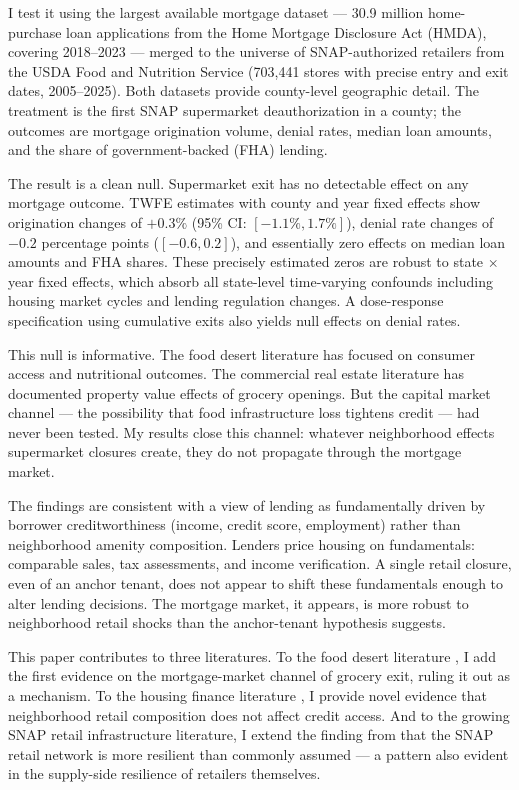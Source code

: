 \documentclass[12pt]{article}
\begin{document}
I test it using the largest available mortgage dataset --- 30.9 million home-purchase loan applications from the Home Mortgage Disclosure Act (HMDA), covering 2018--2023 --- merged to the universe of SNAP-authorized retailers from the USDA Food and Nutrition Service (703,441 stores with precise entry and exit dates, 2005--2025). Both datasets provide county-level geographic detail. The treatment is the first SNAP supermarket deauthorization in a county; the outcomes are mortgage origination volume, denial rates, median loan amounts, and the share of government-backed (FHA) lending.

The result is a clean null. Supermarket exit has no detectable effect on any mortgage outcome. TWFE estimates with county and year fixed effects show origination changes of $+0.3\%$ (95\% CI: $[-1.1\%, 1.7\%]$), denial rate changes of $-0.2$ percentage points ($[-0.6, 0.2]$), and essentially zero effects on median loan amounts and FHA shares. These precisely estimated zeros are robust to state $\times$ year fixed effects, which absorb all state-level time-varying confounds including housing market cycles and lending regulation changes. A dose-response specification using cumulative exits also yields null effects on denial rates.

This null is informative. The food desert literature \citep{allcott2019food, handbury2015goods} has focused on consumer access and nutritional outcomes. The commercial real estate literature \citep{qian2023grocery, kolea2021fresh} has documented property value effects of grocery openings. But the capital market channel --- the possibility that food infrastructure loss tightens credit --- had never been tested. My results close this channel: whatever neighborhood effects supermarket closures create, they do not propagate through the mortgage market.

The findings are consistent with a view of lending as fundamentally driven by borrower creditworthiness (income, credit score, employment) rather than neighborhood amenity composition. Lenders price housing on fundamentals: comparable sales, tax assessments, and income verification. A single retail closure, even of an anchor tenant, does not appear to shift these fundamentals enough to alter lending decisions. The mortgage market, it appears, is more robust to neighborhood retail shocks than the anchor-tenant hypothesis suggests.

This paper contributes to three literatures. To the food desert literature \citep{allcott2019food, cuffey2022snap, hoynes2016long}, I add the first evidence on the mortgage-market channel of grocery exit, ruling it out as a mechanism. To the housing finance literature \citep{mian2009consequences, diamond2019effects, avery2021cfpb}, I provide novel evidence that neighborhood retail composition does not affect credit access. And to the growing SNAP retail infrastructure literature, I extend the finding from \citet{usda2023snap} that the SNAP retail network is more resilient than commonly assumed --- a pattern also evident in the supply-side resilience of retailers themselves.
\end{document}
